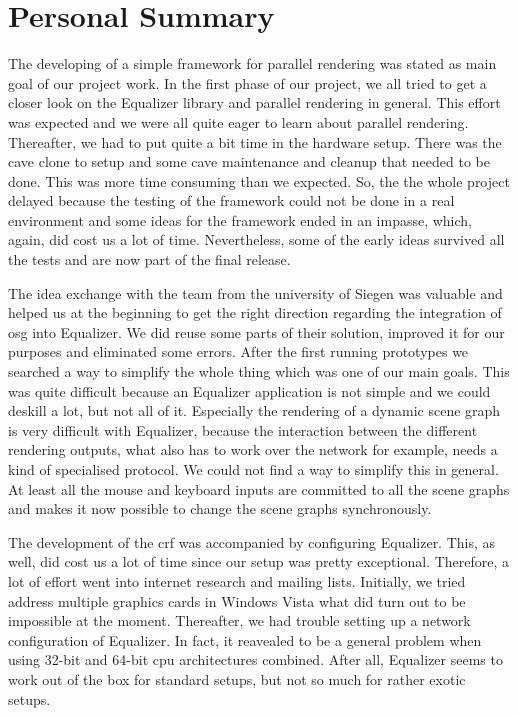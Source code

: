 
\chapter{Personal Summary}

The developing of a simple framework for parallel rendering was stated as main goal of our project work. In the first phase of our project, we all tried to get a closer look on the Equalizer library and parallel rendering in general. This effort was expected and we were all quite eager to learn about parallel rendering. Thereafter, we had to put quite a bit time in the hardware setup. There was the \gls{cave} clone to setup and some \gls{cave} maintenance and cleanup that needed to be done. This was more time consuming than we expected. So, the the whole project delayed because the testing of the framework could not be done in a real environment and some ideas for the framework ended in an impasse, which, again, did cost us a lot of time. Nevertheless, some of the early ideas survived all the tests and are now part of the final release.

The idea exchange with the team from the university of Siegen was valuable and helped us at the beginning to get the right direction regarding the integration of \gls{osg} into Equalizer. We did reuse some parts of their solution, improved it for our purposes and eliminated some errors. After the first running prototypes we searched a way to simplify the whole thing which was one of our main goals. This was quite difficult because an Equalizer application is not simple and we could deskill a lot, but not all of it. Especially the rendering of a dynamic scene graph is very difficult with Equalizer, because the interaction between the different rendering outputs, what also has to work over the network for example, needs a kind of specialised protocol. We could not find a way to simplify this in general.  At least all the mouse and keyboard inputs are committed to all the scene graphs and makes it now possible to change the scene graphs synchronously.

The development of the \gls{crf} was accompanied by configuring Equalizer. This, as well, did cost us a lot of time since our setup was pretty exceptional. Therefore, a lot of effort went into internet research and mailing lists. Initially, we tried address multiple graphics cards in Windows Vista what did turn out to be impossible at the moment. Thereafter, we had trouble setting up a network configuration of Equalizer. In fact, it reavealed to be a general problem when using 32-bit and 64-bit \gls{cpu} architectures combined. After all, Equalizer seems to work out of the box for standard setups, but not so much for rather exotic setups.

